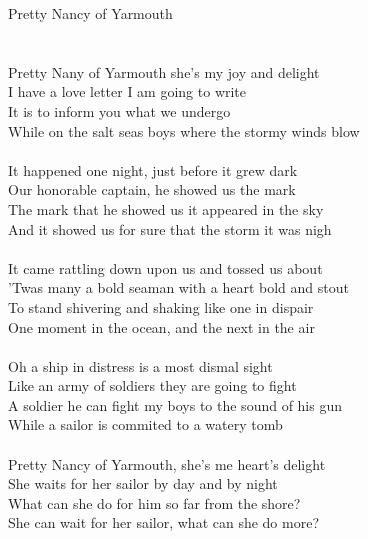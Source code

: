 \documentclass[letterpaper,9pt]{article}
\begin{document}
\newpage
{}
\huge
Pretty Nancy of Yarmouth\\
\\
\LARGE
\noindent
\\Pretty Nany of Yarmouth she's my joy and delight
\\I have a love letter I am going to write
\\It is to inform you what we undergo
\\While on the salt seas boys where the stormy winds blow
\\
\\It happened one night, just before it grew dark
\\Our honorable captain, he showed us the mark
\\The mark that he showed us it appeared in the sky
\\And it showed us for sure that the storm it was nigh
\\
\\It came rattling down upon us and tossed us about
\\'Twas many a bold seaman with a heart bold and stout
\\To stand shivering and shaking like one in dispair
\\One moment in the ocean, and the next in the air
\\
\\Oh a ship in distress is a most dismal sight
\\Like an army of soldiers they are going to fight
\\A soldier he can fight my boys to the sound of his gun
\\While a sailor is commited to a watery tomb
\\
\\Pretty Nancy of Yarmouth, she's me heart's delight
\\She waits for her sailor by day and by night
\\What can she do for him so far from the shore?
\\She can wait for her sailor, what can she do more?
\end{document}
